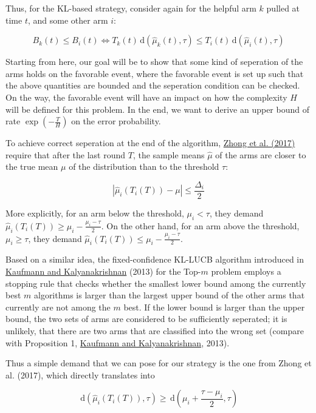 \documentclass[12pt,]{article}
\newcommand{\der}{\,\text{d}}
\begin{document}
Thus, for the KL-based strategy, consider again for the helpful arm
\(k\) pulled at time \(t\), and some other arm \(i\):

\[
B_k(t) \leq B_i(t) \Leftrightarrow T_k(t) \der(\hat{\mu}_k(t), \tau) \leq T_i(t) \der(\hat{\mu}_i(t), \tau)
\]

Starting from here, our goal will be to show that some kind of
seperation of the arms holds on the favorable event, where the favorable
event is set up such that the above quantities are bounded and the
seperation condition can be checked. On the way, the favorable event
will have an impact on how the complexity \(H\) will be defined for this
problem. In the end, we want to derive an upper bound of rate
\(\exp(-\frac{T}{H})\) on the error probability.

To achieve correct seperation at the end of the algorithm,
\href{https://arxiv.org/pdf/1704.04567.pdf}{Zhong et al. (2017)} require
that after the last round \(T\), the sample means \(\hat{\mu}\) of the
arms are closer to the true mean \(\mu\) of the distribution than to the
threshold \(\tau\):

\[
|\hat{\mu}_i(T_i(T)) - \mu| \leq \frac{\Delta_i}{2}
\]

More explicitly, for an arm below the threshold, \(\mu_i < \tau\), they
demand \(\hat{\mu}_i(T_i(T)) \geq \mu_i - \frac{\mu_i-\tau}{2}\). On the
other hand, for an arm above the threshold, \(\mu_i \geq \tau\), they
demand \(\hat{\mu}_i(T_i(T)) \leq \mu_i - \frac{\mu_i-\tau}{2}\).

Based on a similar idea, the fixed-confidence KL-LUCB algorithm
introduced in
\href{http://proceedings.mlr.press/v30/Kaufmann13.pdf}{Kaufmann and
Kalyanakrishnan} (2013) for the Top-\(m\) problem employs a stopping
rule that checks whether the smallest lower bound among the currently
best \(m\) algorithms is larger than the largest upper bound of the
other arms that currently are not among the \(m\) best. If the lower
bound is larger than the upper bound, the two sets of arms are
considered to be sufficiently seperated; it is unlikely, that there are
two arms that are classified into the wrong set (compare with
Proposition 1,
\href{http://proceedings.mlr.press/v30/Kaufmann13.pdf}{Kaufmann and
Kalyanakrishnan}, 2013).

Thus a simple demand that we can pose for our strategy is the one from
Zhong et al. (2017), which directly translates into

\[
\der(\hat{\mu}_i(T_i(T)), \tau) \geq \der(\mu_i +\frac{\tau-\mu_i}{2}, \tau)
\]
\end{document}
